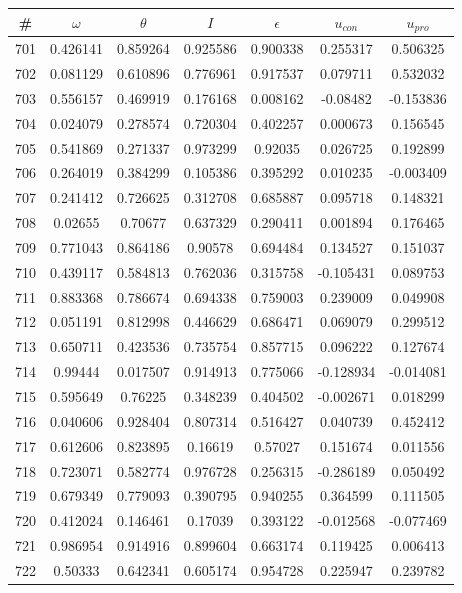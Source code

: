 \begin{table}
\begin{tabular}{c|c|c|c|c|c|c}
\# & $\omega$ & $\theta$ & $I$ & $\epsilon$ & $u_{con}$ & $u_{pro}$\\
\hline
701 & 0.426141 & 0.859264 & 0.925586 & 0.900338 & 0.255317 & 0.506325\\
702 & 0.081129 & 0.610896 & 0.776961 & 0.917537 & 0.079711 & 0.532032\\
703 & 0.556157 & 0.469919 & 0.176168 & 0.008162 & -0.08482 & -0.153836\\
704 & 0.024079 & 0.278574 & 0.720304 & 0.402257 & 0.000673 & 0.156545\\
705 & 0.541869 & 0.271337 & 0.973299 & 0.92035 & 0.026725 & 0.192899\\
706 & 0.264019 & 0.384299 & 0.105386 & 0.395292 & 0.010235 & -0.003409\\
707 & 0.241412 & 0.726625 & 0.312708 & 0.685887 & 0.095718 & 0.148321\\
708 & 0.02655 & 0.70677 & 0.637329 & 0.290411 & 0.001894 & 0.176465\\
709 & 0.771043 & 0.864186 & 0.90578 & 0.694484 & 0.134527 & 0.151037\\
710 & 0.439117 & 0.584813 & 0.762036 & 0.315758 & -0.105431 & 0.089753\\
711 & 0.883368 & 0.786674 & 0.694338 & 0.759003 & 0.239009 & 0.049908\\
712 & 0.051191 & 0.812998 & 0.446629 & 0.686471 & 0.069079 & 0.299512\\
713 & 0.650711 & 0.423536 & 0.735754 & 0.857715 & 0.096222 & 0.127674\\
714 & 0.99444 & 0.017507 & 0.914913 & 0.775066 & -0.128934 & -0.014081\\
715 & 0.595649 & 0.76225 & 0.348239 & 0.404502 & -0.002671 & 0.018299\\
716 & 0.040606 & 0.928404 & 0.807314 & 0.516427 & 0.040739 & 0.452412\\
717 & 0.612606 & 0.823895 & 0.16619 & 0.57027 & 0.151674 & 0.011556\\
718 & 0.723071 & 0.582774 & 0.976728 & 0.256315 & -0.286189 & 0.050492\\
719 & 0.679349 & 0.779093 & 0.390795 & 0.940255 & 0.364599 & 0.111505\\
720 & 0.412024 & 0.146461 & 0.17039 & 0.393122 & -0.012568 & -0.077469\\
721 & 0.986954 & 0.914916 & 0.899604 & 0.663174 & 0.119425 & 0.006413\\
722 & 0.50333 & 0.642341 & 0.605174 & 0.954728 & 0.225947 & 0.239782\\

\end{tabular}
\end{table}
